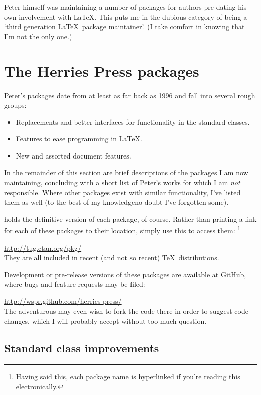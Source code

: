 \documentclass[final]{ltugboat}
\begin{document}
Peter himself was maintaining a number of packages for authors pre-dating his own involvement with \LaTeX. This puts me in the dubious category of being a `third generation \LaTeX\ package maintainer'. (I take comfort in knowing that I'm not the only one.)

\section{The Herries Press packages}

Peter's packages date from at least as far back as 1996 and fall into several rough groups:
\begin{itemize}
\item Replacements and better interfaces for functionality in the standard classes.
\item Features to ease programming in \LaTeX.
\item New and assorted document features.
\end{itemize}
In the remainder of this section are brief descriptions of the packages I am now maintaining, concluding with a short list of Peter's works for which I am \emph{not} responsible. Where other packages exist with similar functionality, I've listed them as well (to the best of my knowledge\Dash no doubt I've forgotten some).

 holds the definitive version of each package, of course.
Rather than printing a link for each of these packages to their  location, simply use this  to access them:%
\footnote{Having said this, each package name is hyperlinked if you're reading this electronically.}%
\par
\url{http://tug.ctan.org/pkg/}\\
They are all included in recent (and not so recent) \TeX\ distributions.

Development or pre-release versions of these packages are available at GitHub, where bugs and feature requests may be filed:\par
\url{http://wspr.github.com/herries-press/}\\
The adventurous may even wish to fork the code there in order to suggest code changes, which I will probably accept without too much question.

\subsection{Standard class improvements}
\end{document}

